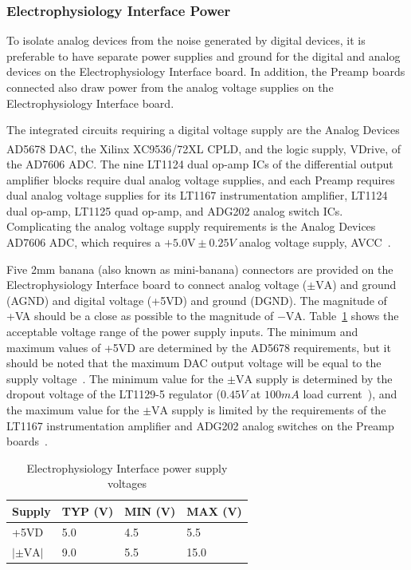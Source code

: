 \subsubsection{Electrophysiology Interface Power}

To isolate analog devices from the noise generated by digital devices, it is preferable to have separate power supplies and ground for the digital and analog devices on the Electrophysiology Interface board.  In addition, the Preamp boards connected also draw power from the analog voltage supplies on the Electrophysiology Interface board.

The integrated circuits requiring a digital voltage supply are the Analog Devices AD5678 DAC, the Xilinx\textsuperscript{\textregistered} XC9536/72XL CPLD, and the logic supply, VDrive, of the AD7606 ADC.  The nine LT1124 dual op-amp ICs of the differential output amplifier blocks require dual analog voltage supplies, and each Preamp requires dual analog voltage supplies for its LT1167 instrumentation amplifier, LT1124 dual op-amp, LT1125 quad op-amp, and ADG202 analog switch ICs.  Complicating the analog voltage supply requirements is the Analog Devices AD7606 ADC, which requires a $+5.0\mathrm{V} \pm 0.25\unit{V}$ analog voltage supply, AVCC~\cite{AD7606ds}.

Five 2mm banana (also known as mini-banana) connectors are provided on the Electrophysiology Interface board to connect analog voltage ($\pm \mathrm{VA}$) and ground (AGND) and digital voltage (+5VD) and ground (DGND).  The magnitude of +VA should be a close as possible to the magnitude of $-\mathrm{VA}$.  Table~\ref{tab:powerinput} shows the acceptable voltage range of the power supply inputs.  The minimum and maximum values of +5VD are determined by the AD5678 requirements, but it should be noted that the maximum DAC output voltage will be equal to the supply voltage~\cite{AD5678ds}.  The minimum value for the $\pm \mathrm{VA}$ supply is determined by the dropout voltage of the LT1129-5 regulator ($0.45\unit{V}$ at $100\unit{mA}$ load current~\cite{LT1129ds}), and the maximum value for the $\pm \mathrm{VA}$ supply is limited by the requirements of the LT1167 instrumentation amplifier and ADG202 analog switches on the Preamp boards~\cite{LT1167ds,ADG202Ads}.

\renewcommand{\arraystretch}{1.3}
\begin{table}[h]
\centering
\begin{tabular}{|l|l|l|l|}
\hline
Supply & TYP (V) & MIN (V) & MAX (V)\\
\hline
+5VD & 5.0 & 4.5 & 5.5\\
\hline
$|\pm \mathrm{VA}|$ & 9.0 & 5.5 & 15.0\\
\hline
\end{tabular}
\caption{Electrophysiology Interface power supply voltages\label{tab:powerinput} }

\end{table}
\renewcommand{\arraystretch}{1.0}

